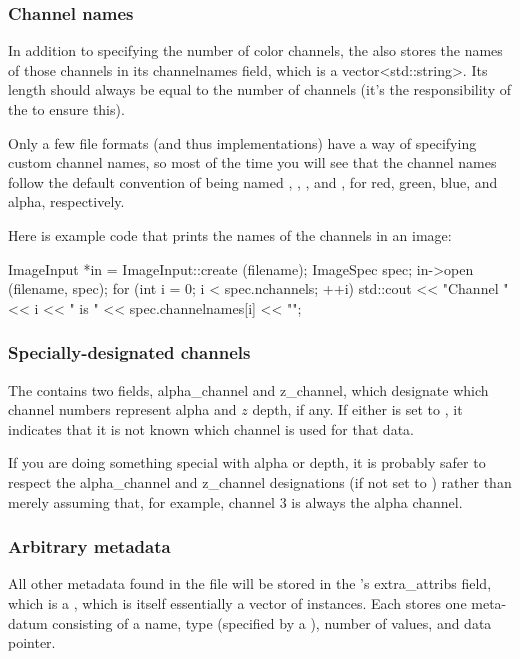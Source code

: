 \subsubsection{Channel names}

In addition to specifying the number of color channels, the
\ImageSpec also stores the names of those channels in its {\cf
  channelnames} field, which is a {\cf vector<std::string>}.  Its length
should always be equal to the number of channels (it's the
responsibility of the \ImageInput to ensure this).

Only a few file formats (and thus \ImageInput implementations) have a
way of specifying custom channel names, so most of the time you will see
that the channel names follow the default convention of being named
, , , and , for red, green, blue, and alpha,
respectively.

Here is example code that prints the names of the channels in an image:

\begin{code}
        ImageInput *in = ImageInput::create (filename);
        ImageSpec spec;
        in->open (filename, spec);
        for (int i = 0;  i < spec.nchannels;  ++i)
            std::cout << "Channel " << i << " is " 
                      << spec.channelnames[i] << "\n";
\end{code}

\subsubsection{Specially-designated channels}

The \ImageSpec contains two fields, {\cf alpha_channel} and {\cf
  z_channel}, which designate which channel numbers represent alpha and
$z$ depth, if any.  If either is set to {}, it indicates that it
is not known which channel is used for that data.

If you are doing something special with alpha or depth, it is probably
safer to respect the {\cf alpha_channel} and {\cf z_channel}
designations (if not set to {}) rather than merely assuming that,
for example, channel 3 is always the alpha channel.

\subsubsection{Arbitrary metadata}

All other metadata found in the file will be stored in the
\ImageSpec's {\cf extra_attribs} field, which is a 
\ParamValueList, which is itself essentially a vector of
\ParamValue instances.  Each \ParamValue
stores one meta-datum consisting of a name, type (specified by 
a \TypeDesc), number of values, and data pointer.


